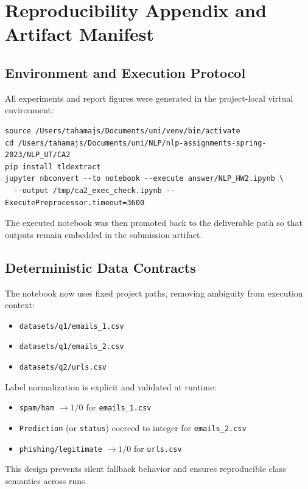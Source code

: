 \section{Reproducibility Appendix and Artifact Manifest}

\subsection{Environment and Execution Protocol}

All experiments and report figures were generated in the project-local virtual environment:
\begin{lstlisting}[basicstyle=\ttfamily\footnotesize,frame=single]
source /Users/tahamajs/Documents/uni/venv/bin/activate
cd /Users/tahamajs/Documents/uni/NLP/nlp-assignments-spring-2023/NLP_UT/CA2
pip install tldextract
jupyter nbconvert --to notebook --execute answer/NLP_HW2.ipynb \
  --output /tmp/ca2_exec_check.ipynb --ExecutePreprocessor.timeout=3600
\end{lstlisting}

The executed notebook was then promoted back to the deliverable path so that outputs remain embedded in the submission artifact.

\subsection{Deterministic Data Contracts}

The notebook now uses fixed project paths, removing ambiguity from execution context:
\begin{itemize}
    \item \texttt{datasets/q1/emails\_1.csv}
    \item \texttt{datasets/q1/emails\_2.csv}
    \item \texttt{datasets/q2/urls.csv}
\end{itemize}

Label normalization is explicit and validated at runtime:
\begin{itemize}
    \item \texttt{spam/ham} $\rightarrow 1/0$ for \texttt{emails\_1.csv}
    \item \texttt{Prediction} (or \texttt{status}) coerced to integer for \texttt{emails\_2.csv}
    \item \texttt{phishing/legitimate} $\rightarrow 1/0$ for \texttt{urls.csv}
\end{itemize}

This design prevents silent fallback behavior and ensures reproducible class semantics across runs.


